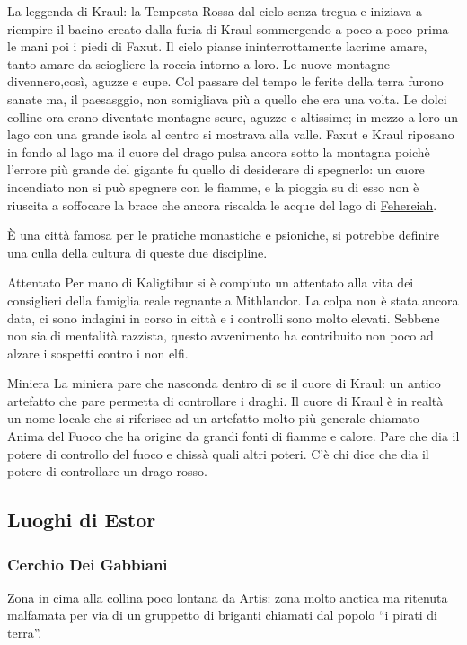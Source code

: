 \documentclass[10pt,twoside,twocolumn]{article}
\begin{document}
\begin{commentbox}{La leggenda di Kraul: la Tempesta Rossa}
  dal cielo senza tregua e iniziava a riempire il bacino creato dalla furia di Kraul
  sommergendo a poco a poco prima le mani poi i piedi di Faxut.
  Il cielo pianse ininterrottamente lacrime amare, tanto amare da
  sciogliere la roccia intorno a loro. Le nuove montagne divennero,cos\`i, aguzze e cupe.
  Col passare del tempo le ferite della terra furono sanate ma, il paesasggio, non
  somigliava pi\`u a quello che era una volta. Le dolci colline ora erano diventate
  montagne scure, aguzze e altissime; in mezzo a loro un lago con una grande isola al centro
  si mostrava alla valle.
  Faxut e Kraul riposano in fondo al lago ma il cuore del drago pulsa ancora sotto la
  montagna poich\`e l'errore pi\`u grande del gigante fu quello di desiderare di spegnerlo:
  un cuore incendiato non si pu\`o spegnere con le fiamme, e la pioggia su di esso non \`e
  riuscita a soffocare la brace che ancora riscalda le acque del lago di \hyperref[loc:fehereiah]{Fehereiah}.
  
\end{commentbox}
\`E una citt\`a famosa per le pratiche monastiche e psioniche, si potrebbe definire
una culla della cultura di queste due discipline.
\begin{commentbox}{Attentato}
  Per mano di Kaligtibur si \`e compiuto un attentato alla vita dei consiglieri della
  famiglia reale regnante a Mithlandor. La colpa non \`e stata ancora data, ci sono
  indagini in corso in citt\`a e i controlli sono molto elevati. Sebbene non sia di
  mentalit\`a razzista, questo avvenimento ha contribuito non poco ad alzare
  i sospetti contro i non elfi.
\end{commentbox}
\begin{commentbox}{Miniera}
  La miniera pare che nasconda dentro di se il cuore di Kraul: un antico artefatto che
  pare permetta di controllare i draghi. Il cuore di Kraul \`e in realt\`a un nome
  locale che si riferisce ad un artefatto molto pi\`u generale chiamato Anima del
  Fuoco che ha origine da grandi fonti di fiamme e calore. Pare che dia il potere di
  controllo del fuoco e chiss\`a quali altri poteri. C'\`e chi dice che dia
  il potere di controllare un drago rosso.
\end{commentbox}
\subsection{Luoghi di Estor}
\subsubsection{Cerchio Dei Gabbiani}\label{loc:gabbiani}
Zona in cima alla collina poco lontana da Artis: zona molto anctica ma ritenuta
malfamata per via di un gruppetto di briganti chiamati dal popolo ``i pirati
di terra''.
\end{document}
